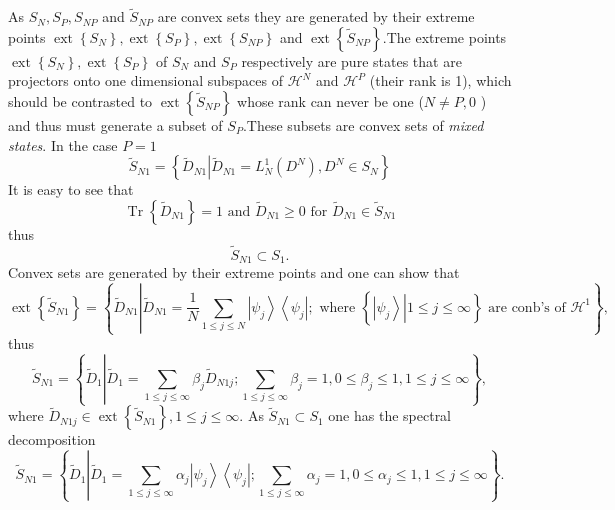 \documentclass[aps,preprint]{revtex4}%
\begin{document}
As $S_{N},S_{P},S_{NP}$ and $\tilde{S}_{NP}$ are convex sets they are
generated by their extreme points $\operatorname*{ext}\left\{  S_{N}\right\}
,\operatorname*{ext}\left\{  S_{P}\right\}  ,\operatorname*{ext}\left\{
S_{NP}\right\}  $ and $\operatorname*{ext}\left\{  \tilde{S}_{NP}\right\}
.$The extreme points $\operatorname*{ext}\left\{  S_{N}\right\}
,\operatorname*{ext}\left\{  S_{P}\right\}  $ of $S_{N}$ and $S_{P}$
respectively are pure states that are projectors onto one dimensional
subspaces of $\mathcal{H}^{N}$ and $\mathcal{H}^{P}$ (their rank is 1), which
should be contrasted to $\operatorname*{ext}\left\{  \tilde{S}_{NP}\right\}  $
whose rank can never be one ($N\neq P,0$ ) and thus must generate a subset of
$S_{P}.$These subsets are convex sets of \emph{mixed states}$.$ In the case
$P=1$
\begin{equation}
\tilde{S}_{N1}=\left\{  \left.  \tilde{D}_{N1}\right\vert \tilde{D}_{N1}%
=L_{N}^{1}\left(  D^{N}\right)  ,D^{N}\in S_{N}\right\} \nonumber
\end{equation}
It is easy to see that
\begin{equation}
\operatorname*{Tr}\left\{  \tilde{D}_{N1}\right\}  =1\text{ and }\tilde
{D}_{N1}\geq0\text{ for }\tilde{D}_{N1}\in\tilde{S}_{N1}%
\end{equation}
thus
\begin{equation}
\tilde{S}_{N1}\subset S_{1}.
\end{equation}
Convex sets are generated by their extreme points and one can show that
\begin{equation}
\operatorname*{ext}\left\{  \tilde{S}_{N1}\right\}  =\left\{  \tilde{D}%
_{N1}\left\vert \tilde{D}_{N1}=\frac{1}{N}\sum_{1\leq j\leq N}\left\vert
\psi_{j}\right\rangle \left\langle \psi_{j}\right\vert ;\text{ where }\left\{
\left.  \left\vert \psi_{j}\right\rangle \right\vert 1\leq j\leq
\infty\right\}  \text{ are conb's of }\mathcal{H}^{1}\right.  \right\}  ,
\end{equation}
thus%
\begin{equation}
\tilde{S}_{N1}=\left\{  \tilde{D}_{1}\left\vert \tilde{D}_{1}=\sum_{1\leq
j\leq\infty}\beta_{j}\tilde{D}_{N1j};\sum_{1\leq j\leq\infty}\beta_{j}%
=1,0\leq\beta_{j}\leq1,1\leq j\leq\infty\right.  \right\}  ,
\end{equation}
where $\tilde{D}_{N1j}\in\operatorname*{ext}\left\{  \tilde{S}_{N1}\right\}
,1\leq j\leq\infty.$ As $\tilde{S}_{N1}\subset S_{1}$ one has the spectral
decomposition
\begin{equation}
\tilde{S}_{N1}=\left\{  \tilde{D}_{1}\left\vert \tilde{D}_{1}=\sum_{1\leq
j\leq\infty}\alpha_{j}\left\vert \psi_{j}\right\rangle \left\langle \psi
_{j}\right\vert ;\sum_{1\leq j\leq\infty}\alpha_{j}=1,0\leq\alpha_{j}%
\leq1,1\leq j\leq\infty\right.  \right\}  .
\end{equation}
\end{document}
